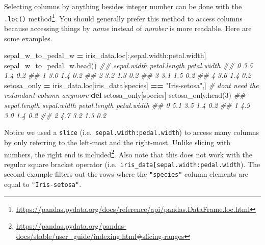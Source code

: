\documentclass[
  12pt,
  krantz2]{krantz}
\makeatletter
\newenvironment{Shaded}{\begin{snugshade}}{\end{snugshade}}
\newcommand{\CommentTok}[1]{\textcolor[rgb]{0.37,0.37,0.37}{\textit{#1}}}
\newcommand{\DecValTok}[1]{\textcolor[rgb]{0.06,0.06,0.06}{#1}}
\newcommand{\KeywordTok}[1]{\textcolor[rgb]{0.27,0.27,0.27}{\textbf{#1}}}
\newcommand{\NormalTok}[1]{#1}
\newcommand{\OperatorTok}[1]{\textcolor[rgb]{0.43,0.43,0.43}{\textbf{#1}}}
\newcommand{\StringTok}[1]{\textcolor[rgb]{0.5,0.5,0.5}{#1}}
\renewcommand{\href}[2]{#2\footnote{\url{#1}}}
\newenvironment{kframe}{%
\medskip{}
\setlength{\fboxsep}{.8em}
 \def\at@end@of@kframe{}%
 \ifinner\ifhmode%
  \def\at@end@of@kframe{\end{minipage}}%
  \begin{minipage}{\columnwidth}%
 \fi\fi%
 \def\FrameCommand##1{\hskip\@totalleftmargin \hskip-\fboxsep
 \colorbox{shadecolor}{##1}\hskip-\fboxsep
     \hskip-\linewidth \hskip-\@totalleftmargin \hskip\columnwidth}%
 \MakeFramed {\advance\hsize-\width
   \@totalleftmargin\z@ \linewidth\hsize
   \@setminipage}}%
 {\par\unskip\endMakeFramed%
 \at@end@of@kframe}
\renewenvironment{Shaded}{\begin{kframe}}{\end{kframe}}
\makeatother
\begin{document}
Selecting columns by anything besides integer number can be done with the \href{https://pandas.pydata.org/docs/reference/api/pandas.DataFrame.loc.html}{\texttt{.loc()} method}. You should generally prefer this method to access columns because accessing things by \emph{name} instead of \emph{number} is more readable. Here are some examples.

\begin{Shaded}
\begin{Highlighting}[]
\NormalTok{sepal\_w\_to\_pedal\_w }\OperatorTok{=}\NormalTok{ iris\_data.loc[:,}\StringTok{\textquotesingle{}sepal.width\textquotesingle{}}\NormalTok{:}\StringTok{\textquotesingle{}petal.width\textquotesingle{}}\NormalTok{]}
\NormalTok{sepal\_w\_to\_pedal\_w.head()}
\CommentTok{\#\#    sepal.width  petal.length  petal.width}
\CommentTok{\#\# 0          3.5           1.4          0.2}
\CommentTok{\#\# 1          3.0           1.4          0.2}
\CommentTok{\#\# 2          3.2           1.3          0.2}
\CommentTok{\#\# 3          3.1           1.5          0.2}
\CommentTok{\#\# 4          3.6           1.4          0.2}
\NormalTok{setosa\_only }\OperatorTok{=}\NormalTok{ iris\_data.loc[iris\_data[}\StringTok{\textquotesingle{}species\textquotesingle{}}\NormalTok{] }\OperatorTok{==} \StringTok{"Iris{-}setosa"}\NormalTok{,]}
\CommentTok{\# don\textquotesingle{}t need the redundant column anymore}
\KeywordTok{del}\NormalTok{ setosa\_only[}\StringTok{\textquotesingle{}species\textquotesingle{}}\NormalTok{]}
\NormalTok{setosa\_only.head(}\DecValTok{3}\NormalTok{)}
\CommentTok{\#\#    sepal.length  sepal.width  petal.length  petal.width}
\CommentTok{\#\# 0           5.1          3.5           1.4          0.2}
\CommentTok{\#\# 1           4.9          3.0           1.4          0.2}
\CommentTok{\#\# 2           4.7          3.2           1.3          0.2}
\end{Highlighting}
\end{Shaded}

Notice we used a \texttt{slice} (i.e.~\texttt{\textquotesingle{}sepal.width\textquotesingle{}:\textquotesingle{}pedal.width\textquotesingle{}}) to access many columns by only referring to the left-most and the right-most. Unlike slicing with numbers, \href{https://pandas.pydata.org/pandas-docs/stable/user_guide/indexing.html\#slicing-ranges}{the right end is included}. Also note that this does not work with the regular square bracket operator (i.e.~\texttt{iris\_data{[}\textquotesingle{}sepal.width\textquotesingle{}:\textquotesingle{}pedal.width\textquotesingle{}{]}}). The second example filters out the rows where the \texttt{"species"} column elements are equal to \texttt{"Iris-setosa"}.
\end{document}
